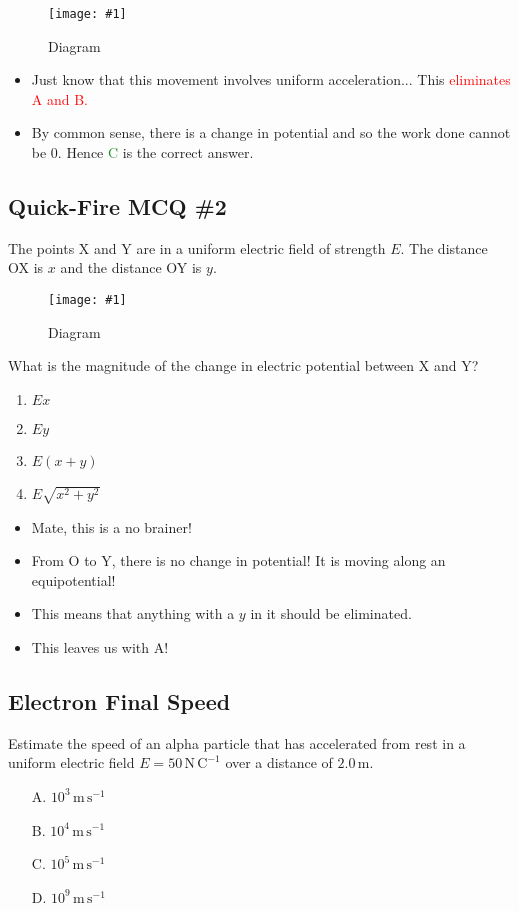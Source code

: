 \documentclass[a4paper,12pt]{article}
\newcommand{\img}[4]{\begin{center}
  \begin{figure}[H]
    \centering
    \texttt{[image: \#1]}
    \caption{#3}
    \label{fig:#4}
  \end{figure}
\end{center}}
\begin{document}
\img{ex/8.png}{0.9}{Diagram}{ex8}

\begin{itemize}
  \item Just know that this movement involves uniform acceleration... This \textcolor{red}{eliminates A and B.}
  \item By common sense, there is a change in potential and so the work done cannot be 0. Hence \textcolor{ForestGreen}{C} is the correct answer.
\end{itemize}

\subsection{Quick-Fire MCQ \#2}

The points X and Y are in a uniform electric field of strength $E$. The distance OX is $x$ and the distance OY is $y$.

\img{ex/9.png}{0.3}{Diagram}{ex9}


What is the magnitude of the change in electric potential between X and Y?

\begin{enumerate}[label=\Alph*.]
  \item $Ex$
  \item $Ey$
  \item $E(x + y)$
  \item $E\sqrt{x^2 + y^2}$
\end{enumerate}

\begin{itemize}
  \item Mate, this is a no brainer!
  \item From O to Y, there is no change in potential! It is moving along an equipotential!
  \item This means that anything with a $y$ in it should be eliminated.
  \item This leaves us with A!
\end{itemize}

\pagebreak

\subsection{Electron Final Speed}

Estimate the speed of an alpha particle that has accelerated from rest in a uniform electric field $E = 50 \, \mathrm{N \, C^{-1}}$ over a distance of $2.0 \, \mathrm{m}$.

\begin{itemize}
  \item[A.] $10^3 \, \mathrm{m \, s^{-1}}$
  \item[B.] $10^4 \, \mathrm{m \, s^{-1}}$
  \item[C.] $10^5 \, \mathrm{m \, s^{-1}}$
  \item[D.] $10^9 \, \mathrm{m \, s^{-1}}$
\end{itemize}
\end{document}
